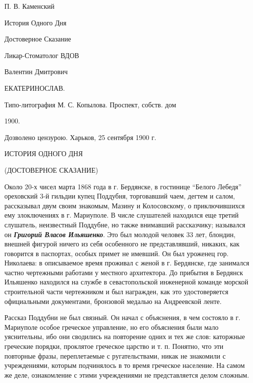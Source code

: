 \documentclass[a4paper,20pt]{article}
\begin{document}
\Large

П. В. Каменский

История Одного Дня

Достоверное Сказание

Ликар-Стоматолог ВДОВ

Валентин Дмитрович

ЕКАТЕРИНОСЛАВ.

Типо-литография М. С. Копылова. Проспект, собств. дом

1900.


Дозволено цензурою. Харьков, 25 сентября 1900 г.


ИСТОРИЯ ОДНОГО ДНЯ

(ДОСТОВЕРНОЕ СКАЗАНИЕ)

Около 20-х чисел марта 1868 года в г. Бердянске,
в гостинице ``Белого Лебедя'' ореховский 3-й гильдии купец Поддубня,
торговавший чаем, дегтем и салом, рассказывал двум своим знакомым, Мазину и Колосовскому,
о приключившихся ему злоключениях в г. Мариуполе. В числе слушателей
находился еще третий слушатель, неизвестный Поддубне, но также внимавший рассказчику;
назывался он \textbf{\em Григорий Власов Ильяшенко}. Это был молодой человек 33 лет, блондин, внешней 
фигурой ничего из себя особенного не представлявший, никаких, как говорится в паспортах, особых примет не имевший.
Он был уроженец гор. Николаева: в описываемое время проживал с женой в г. Бердянске, где занимался частно
чертежными работами у местного архитектора. До прибытия в Бердянск Ильяшенко
находился на службе в севастопольской инженерной команде морской строительной части
чертежником и был награжден, как это удостоверяется
официальными документами, бронзовой медалью на Андреевской ленте.

Рассказ Поддубни не был связный. Он начал с объяснения, в чем состояло в г. Мариуполе
особое греческое управление, но его объяснения были мало уяснительны,
ибо они сводились на повторение одних и тех же слов: каторжные греческие порядки,
проклятое греческое царство и т. п. Понятно, что эти повторные фразы,
переплетаемые с ругательствами, никак не знакомили 
с учреждениями, которым подчинялось в то время греческое население.
На самом же деле, ознакомление с этими учреждениями не представляется делом сложным.
\end{document}

